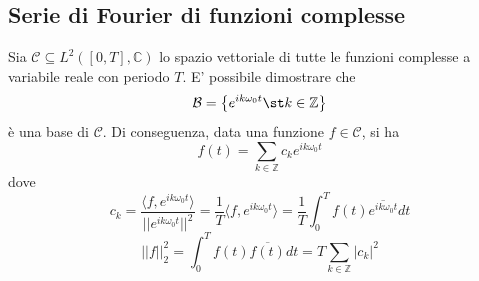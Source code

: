     \subsection{Serie di Fourier di funzioni complesse}
    Sia $\mathcal{C} \subseteq L^{2}([0, T], \mathbb{C})$ lo spazio vettoriale di tutte le funzioni complesse a variabile reale con periodo $T$.
    E' possibile dimostrare che
    \[
        \mathcal{B} = \left\{ e^{ik\omega_{0}t} \st k \in \mathbb{Z} \right\}
    \]
    è una base di $\mathcal{C}$.
    Di conseguenza, data una funzione $f \in \mathcal{C}$, si ha
    \[
        f(t) = \sum_{k \in \mathbb{Z}} c_{k} e^{ik\omega_{0}t}
    \]
    dove
    \[
        c_{k} = \frac{\langle f, e^{ik\omega_{0}t} \rangle}{||e^{ik\omega_{0}t}||^{2}} = \frac{1}{T} \langle f, e^{ik\omega_{0}t} \rangle  = \frac{1}{T} \int_{0}^{T} f(t) \overline{e^{ik\omega_{0}t}} dt
    \]
    \[
        ||f||^{2}_{2} = \int_{0}^{T} f(t) \overline{f(t)} dt = T \sum_{k \in \mathbb{Z}} |c_{k}|^{2}
    \]
